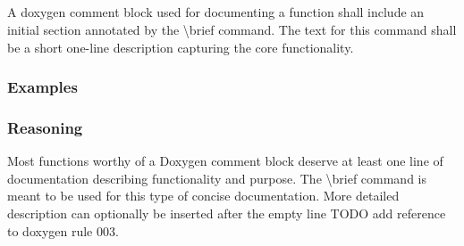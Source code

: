 \subsection*{\doxygenRule{}}

A doxygen comment block used for documenting a function shall include an initial section annotated by the \textbackslash brief command. The text for this command shall be a short one-line description capturing the core functionality.

\subsubsection*{Examples}

\noindent
\begin{minipage}[t]{\codelstwidth\textwidth}
    
\end{minipage}\hfill
\begin{minipage}[t]{\codelstwidth\textwidth}
    
\end{minipage}

\subsubsection*{Reasoning}

 Most functions worthy of a Doxygen comment block deserve at least one line of documentation describing functionality and purpose. The \textbackslash brief command is meant to be used for this type of concise documentation. More detailed description can optionally be inserted after the empty line TODO add reference to doxygen rule 003.
